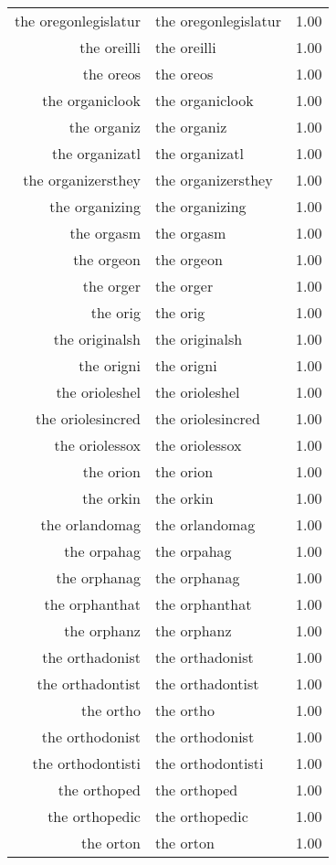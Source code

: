 \begin{table}[ht]
\begin{tabular}{rlr}
  the oregonlegislatur & the oregonlegislatur & 1.00 \\ 
  the oreilli & the oreilli & 1.00 \\ 
  the oreos & the oreos & 1.00 \\ 
  the organiclook & the organiclook & 1.00 \\ 
  the organiz & the organiz & 1.00 \\ 
  the organizatl & the organizatl & 1.00 \\ 
  the organizersthey & the organizersthey & 1.00 \\ 
  the organizing & the organizing & 1.00 \\ 
  the orgasm & the orgasm & 1.00 \\ 
  the orgeon & the orgeon & 1.00 \\ 
  the orger & the orger & 1.00 \\ 
  the orig & the orig & 1.00 \\ 
  the originalsh & the originalsh & 1.00 \\ 
  the origni & the origni & 1.00 \\ 
  the orioleshel & the orioleshel & 1.00 \\ 
  the oriolesincred & the oriolesincred & 1.00 \\ 
  the oriolessox & the oriolessox & 1.00 \\ 
  the orion & the orion & 1.00 \\ 
  the orkin & the orkin & 1.00 \\ 
  the orlandomag & the orlandomag & 1.00 \\ 
  the orpahag & the orpahag & 1.00 \\ 
  the orphanag & the orphanag & 1.00 \\ 
  the orphanthat & the orphanthat & 1.00 \\ 
  the orphanz & the orphanz & 1.00 \\ 
  the orthadonist & the orthadonist & 1.00 \\ 
  the orthadontist & the orthadontist & 1.00 \\ 
  the ortho & the ortho & 1.00 \\ 
  the orthodonist & the orthodonist & 1.00 \\ 
  the orthodontisti & the orthodontisti & 1.00 \\ 
  the orthoped & the orthoped & 1.00 \\ 
  the orthopedic & the orthopedic & 1.00 \\ 
  the orton & the orton & 1.00 \\ 

\end{tabular}
\end{table}
